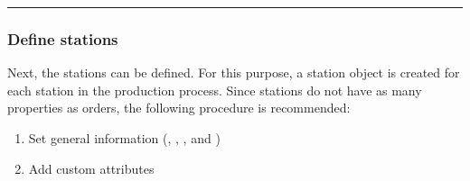 \documentclass[letterpaper,10pt,english]{sphinxmanual}
\begin{document}
\begin{sphinxVerbatim}[commandchars=\\\{\}]
       \PYG{p}{[}\PYG{p}{],}
       \PYG{p}{[[}\PYG{p}{]],}
       \PYG{p}{[[}\PYG{p}{]]}
       
       
       
       \PYG{p}{[}\PYG{p}{],}
       \PYG{p}{[}\PYG{p}{],}
       \PYG{p}{[}\PYG{p}{]}
       
       
       
       \PYG{p}{[}\PYG{p}{],}
       \PYG{p}{[}\PYG{p}{]}
  \PYG{p}{]}
\end{sphinxVerbatim}


\bigskip\hrule\bigskip



\subsubsection{Define stations}
\label{\detokenize{source/Examples/example01:define-stations}}\label{\detokenize{source/Examples/example01:define-station}}
\sphinxAtStartPar
Next, the stations can be defined. For this purpose, a station object is created for each station in the production
process. Since stations do not have as many properties as orders, the following procedure is recommended:
\begin{enumerate}
%
\item {} 
\sphinxAtStartPar
Set general information (, , , and )

\item {} 
\sphinxAtStartPar
Add custom attributes

\end{enumerate}
\end{document}
